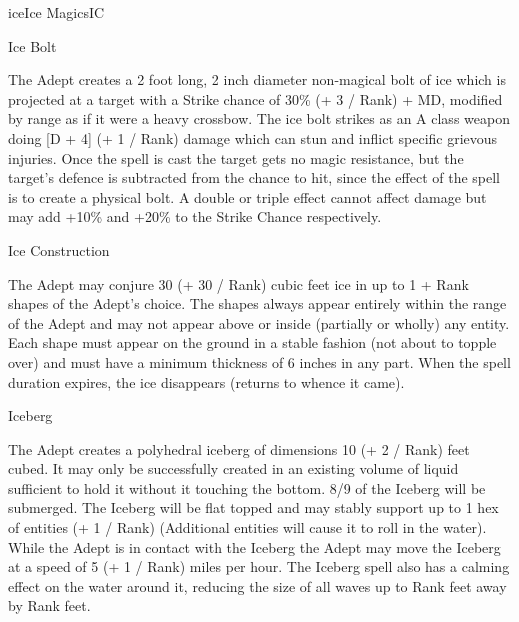 \begin{College}[1.5]{ice}{Ice Magics}{IC}
\begin{spell}[S-7]{Ice Bolt}
\begin{effects}
The Adept creates a 2 foot long, 2 inch diameter non-magical bolt of
ice which is projected at a target with a Strike chance of 30\% (+ 3 /
Rank) + MD, modified by range as if it were a heavy crossbow.  The ice
bolt strikes as an A class weapon doing [D + 4] (+ 1 / Rank) damage
which can stun and inflict specific grievous injuries. Once the spell
is cast the target gets no magic resistance, but the target’s defence
is subtracted from the chance to hit, since the effect of the spell is
to create a physical bolt.  A double or triple effect cannot affect
damage but may add +10\% and +20\% to the Strike Chance respectively.
\end{effects}
\end{spell}

\begin{spell}[S-8]{Ice Construction}
\begin{effects}
The Adept may conjure 30 (+ 30 / Rank) cubic feet ice in up to 1 +
Rank shapes of the Adept’s choice. The shapes always appear entirely
within the range of the Adept and may not appear above or inside
(partially or wholly) any entity.  Each shape must appear on the
ground in a stable fashion (not about to topple over) and must have a
minimum thickness of 6 inches in any part. When the spell duration
expires, the ice disappears (returns to whence it came).
\end{effects}
\end{spell}

\begin{spell}[S-9]{Iceberg}

\begin{effects}
The Adept creates a polyhedral iceberg of dimensions 10 (+ 2 / Rank)
feet cubed. It may only be successfully created in an existing volume
of liquid sufficient to hold it without it touching the bottom. 8/9 of
the Iceberg will be submerged. The Iceberg will be flat topped and may
stably support up to 1 hex of entities (+ 1 / Rank) (Additional
entities will cause it to roll in the water). While the Adept is in
contact with the Iceberg the Adept may move the Iceberg at a speed of
5 (+ 1 / Rank) miles per hour.  The Iceberg spell also has a calming
effect on the water around it, reducing the size of all waves up to
Rank feet away by Rank feet.
\end{effects}
\end{spell}


\end{College}
